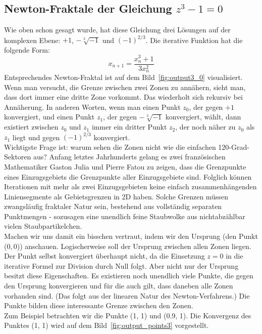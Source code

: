 \documentclass[a4paper,12pt]{llncs}
\numberwithin{equation}{section}
\begin{document}
\subsection{Newton-Fraktale der Gleichung $z^3 - 1 = 0$}
Wie oben schon gesagt wurde, hat diese Gleichung drei Lösungen auf der komplexen Ebene: $+1$, $-\sqrt[3]{-1}$ und $(-1)^{2/3}$.
Die iterative Funktion hat die folgende Form:
\[
x_{n+1} = \frac{x_n^3+1}{3 x_n^2}
\] 
Entsprechendes Newton-Fraktal ist auf dem Bild~\ref{fig:output3_0} visualisiert. 
Wenn man versucht, die Grenze zwischen zwei Zonen zu annähern, sieht man, dass dort immer eine dritte Zone vorkommt. 
Das wiederholt sich rekursiv bei Annäherung.
In anderen Worten, wenn man einen Punkt $z_0$, der gegen $+1$ konvergiert, und einen Punkt $z_1$, der gegen  $-\sqrt[3]{-1}$ konvergiert, wählt, dann existiert zwischen $z_0$ und $z_1$ immer ein dritter Punkt $z_2$, der noch näher zu $z_0$ als $z_1$ liegt und gegen $(-1)^{2/3}$ konvergiert. \\
Wichtigste Frage ist: warum sehen die Zonen nicht wie die einfachen 120-Grad-Sektoren aus?
Anfang letztes Jahrhunderts gelang es zwei französischen Mathematiker Gaston Julia und Pierre Fatou zu zeigen, dass die Grenzpunkte eines Einzugsgebiets die Grenzpunkte aller Einzugsgebiete sind. 
Folglich können Iterationen mit mehr als zwei Einzugsgebieten keine einfach zusammenhängenden Liniensegmente als Gebietsgrenzen in 2D haben. 
Solche Grenzen müssen zwangsläufig fraktaler Natur sein, bestehend aus vollständig separaten Punktmengen - sozusagen eine unendlich feine Staubwolke aus nichtabzählbar vielen Staubpartikelchen.~\cite{frak_cha}\\
Machen wir uns damit ein bisschen vertraut, indem wir den Ursprung (den Punkt ($0, 0$)) anschauen.
Logischerweise soll der Ursprung zwischen allen Zonen liegen.
Der Punkt selbst konvergiert überhaupt nicht, da die Einsetzung $z=0$ in die iterative Formel zur Division durch Null folgt. 
Aber nicht nur der Ursprung besitzt diese Eigenschaften.
Es existieren noch unendlich viele Punkte, die gegen den Ursprung konvergieren und für die auch gilt, dass daneben alle Zonen vorhanden sind.
(Das folgt aus der linearen Natur des Newton-Verfahrens.)
Die Punkte bilden diese interessante Grenze zwischen den Zonen.\\
Zum Beispiel betrachten wir die Punkte (1, 1) und (0.9, 1). 
Die Konvergenz des Punktes (1, 1) wird auf dem Bild~\ref{fig:output_points3} vorgestellt.\\
\end{document}
